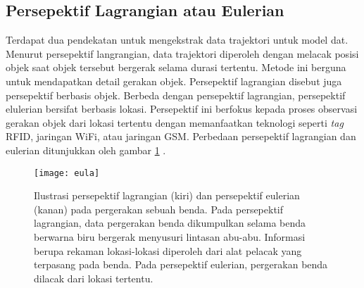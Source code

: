 \subsection{Persepektif Lagrangian atau Eulerian}
Terdapat dua pendekatan untuk mengekstrak data trajektori untuk model dat. Menurut persepektif langrangian, data trajektori diperoleh dengan melacak posisi objek saat objek tersebut bergerak selama durasi tertentu. Metode ini berguna untuk mendapatkan detail gerakan objek. Persepektif lagrangian disebut juga persepektif berbasis objek. Berbeda dengan persepektif lagrangian, persepektif elulerian bersifat berbasis lokasi. Persepektif ini berfokus kepada proses observasi gerakan objek dari lokasi tertentu dengan memanfaatkan teknologi seperti \textit{tag} RFID, jaringan WiFi, atau jaringan GSM. Perbedaan persepektif lagrangian dan eulerian ditunjukkan oleh gambar \ref{fig:eula} \cite{wiratma:19:computations}.
\begin{figure}[H]
	\centering  
	\texttt{[image: eula]}  
	\caption{Ilustrasi persepektif lagrangian (kiri) dan persepektif eulerian (kanan) pada pergerakan sebuah benda. Pada persepektif lagrangian, data pergerakan benda dikumpulkan selama benda berwarna biru bergerak menyusuri lintasan abu-abu. Informasi berupa rekaman lokasi-lokasi diperoleh dari alat pelacak yang terpasang pada benda. Pada persepektif eulerian, pergerakan benda dilacak dari lokasi tertentu.} 
	\label{fig:eula} 
\end{figure}

